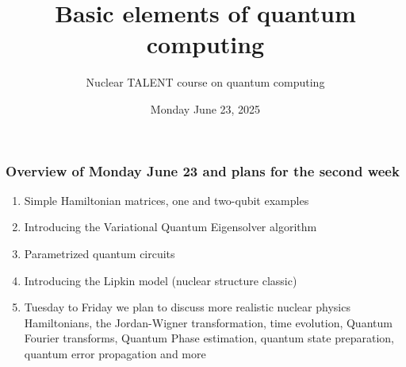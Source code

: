 \documentclass{beamer}
\begin{document}

\newcommand{\exercisesection}[1]{\subsection*{#1}}







\title{Basic elements of quantum computing}


\author{Nuclear TALENT course on quantum computing\inst{}}
\institute{}

\date{Monday June 23, 2025
}

\begin{frame}
\titlepage
\end{frame}

\begin{frame}
\frametitle{Overview of Monday June 23 and plans for the second week}

\begin{block}{}
\begin{enumerate}
\item Simple Hamiltonian matrices, one and two-qubit examples

\item Introducing the Variational Quantum Eigensolver algorithm

\item Parametrized quantum circuits

\item Introducing the Lipkin model (nuclear structure classic)

\item Tuesday to Friday we plan to discuss more realistic nuclear physics Hamiltonians, the  Jordan-Wigner transformation, time evolution, Quantum Fourier transforms, Quantum Phase estimation, quantum state preparation, quantum error propagation and more
\end{enumerate}

\noindent
\end{block}
\end{frame}
\end{document}
